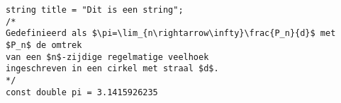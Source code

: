 \begin{verbatim}
string title = "Dit is een string";
/*
Gedefinieerd als $\pi=\lim_{n\rightarrow\infty}\frac{P_n}{d}$ met $P_n$ de omtrek
van een $n$-zijdige regelmatige veelhoek
ingeschreven in een cirkel met straal $d$.
*/
const double pi = 3.1415926235
\end{verbatim}
